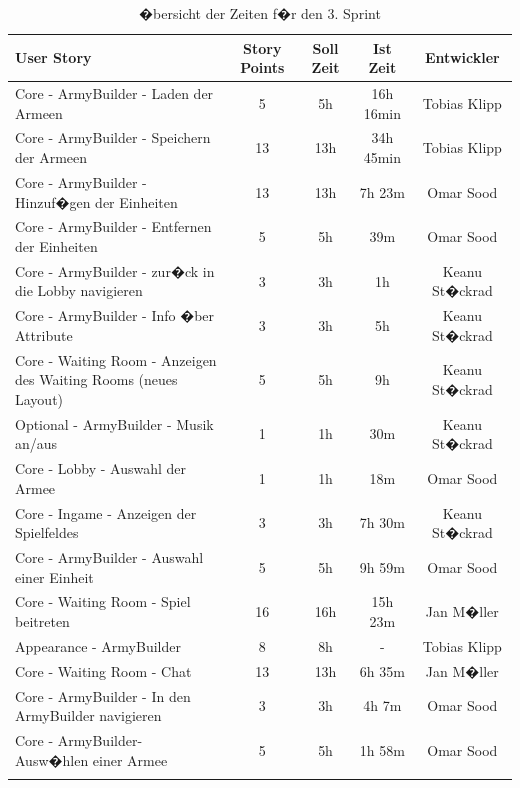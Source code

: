 \documentclass[12pt, titlepage]{scrartcl}
\begin{document}
		\begin{center}
				\begin{longtable}{p{6cm} c c c c }
					
					User Story	& Story Points & Soll Zeit & Ist Zeit & Entwickler\\
					\toprule
					\endhead
					Core - ArmyBuilder - Laden der Armeen & 5 & 5h & 16h 16min & Tobias Klipp \\ \hline 
					
					Core - ArmyBuilder - Speichern der Armeen & 13 & 13h & 34h 45min & Tobias Klipp\\ \hline
					
					Core - ArmyBuilder - Hinzuf�gen der Einheiten & 13 & 13h & 7h 23m & Omar Sood\\ \hline
					
					Core - ArmyBuilder - Entfernen der Einheiten & 5 & 5h & 39m & Omar Sood\\ \hline
					
					Core - ArmyBuilder - zur�ck in die Lobby navigieren & 3 & 3h & 1h & Keanu St�ckrad\\ \hline
						
					Core - ArmyBuilder - Info �ber Attribute & 3 & 3h & 5h & Keanu St�ckrad\\ \hline
			
					Core - Waiting Room - Anzeigen des Waiting Rooms (neues Layout) & 5 & 5h & 9h & Keanu St�ckrad\\ \hline
					
					Optional - ArmyBuilder - Musik an/aus & 1 & 1h & 30m & Keanu St�ckrad\\ \hline
					
					Core - Lobby - Auswahl der Armee  & 1 & 1h & 18m & Omar Sood\\ \hline
					
					Core - Ingame - Anzeigen der Spielfeldes & 3 & 3h & 7h 30m &  Keanu St�ckrad\\ \hline
					
					Core - ArmyBuilder - Auswahl einer Einheit & 5 & 5h & 9h 59m & Omar Sood\\ \hline
					
					Core - Waiting Room - Spiel beitreten & 16 & 16h & 15h 23m & Jan M�ller\\ \hline
					
					Appearance - ArmyBuilder & 8 & 8h & - & Tobias Klipp \\ \hline
					
					Core - Waiting Room - Chat & 13 & 13h & 6h 35m & Jan M�ller\\ \hline
					
					Core - ArmyBuilder - In den ArmyBuilder navigieren & 3 & 3h & 4h 7m & Omar Sood\\ \hline
					
					Core - ArmyBuilder- Ausw�hlen einer Armee & 5 & 5h & 1h 58m & Omar Sood \\
					\caption{�bersicht der Zeiten f�r den 3. Sprint} \\
				\end{longtable}
		\end{center}
			
\end{document}
